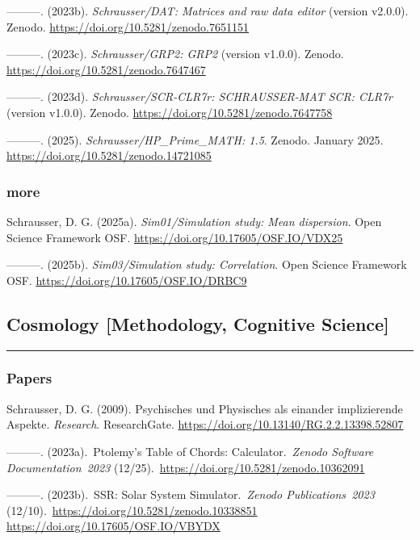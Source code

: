 \documentclass[
]{article}
\begin{document}
---------. (2023b). \emph{Schrausser/DAT: Matrices and raw data editor}
(version v2.0.0). Zenodo. \url{https://doi.org/10.5281/zenodo.7651151}

---------. (2023c). \emph{Schrausser/GRP2: GRP2} (version v1.0.0).
Zenodo. \url{https://doi.org/10.5281/zenodo.7647467}

---------. (2023d). \emph{Schrausser/SCR-CLR7r: SCHRAUSSER-MAT SCR:
CLR7r} (version v1.0.0). Zenodo.
\url{https://doi.org/10.5281/zenodo.7647758}

---------. (2025). \emph{Schrausser/HP\_Prime\_MATH: 1.5}. Zenodo.
January 2025. \url{https://doi.org/10.5281/zenodo.14721085}

\hypertarget{more-2}{%
\subsubsection{more}\label{more-2}}

Schrausser, D. G. (2025a). \emph{Sim01/Simulation study: Mean
dispersion}. Open Science Framework OSF.
\url{https://doi.org/10.17605/OSF.IO/VDX25}

---------. (2025b). \emph{Sim03/Simulation study: Correlation}. Open
Science Framework OSF. \url{https://doi.org/10.17605/OSF.IO/DRBC9}

\hypertarget{cosmology-methodology-cognitive-science}{%
\subsection{Cosmology {[}Methodology, Cognitive
Science{]}}\label{cosmology-methodology-cognitive-science}}

\begin{center}\rule{0.5\linewidth}{0.5pt}\end{center}

\hypertarget{papers-3}{%
\subsubsection{Papers}\label{papers-3}}

Schrausser, D. G. (2009). Psychisches und Physisches als einander
implizierende Aspekte. \emph{Research}. ResearchGate.
\url{https://doi.org/10.13140/RG.2.2.13398.52807}

---------. (2023a).~Ptolemy's Table of Chords: Calculator.~\emph{Zenodo
Software Documentation~2023}
(12/25).~\url{https://doi.org/10.5281/zenodo.10362091}

---------. (2023b).~SSR: Solar System Simulator.~\emph{Zenodo
Publications~2023}
(12/10).~\url{https://doi.org/10.5281/zenodo.10338851}
\url{https://doi.org/10.17605/OSF.IO/VBYDX}
\end{document}

